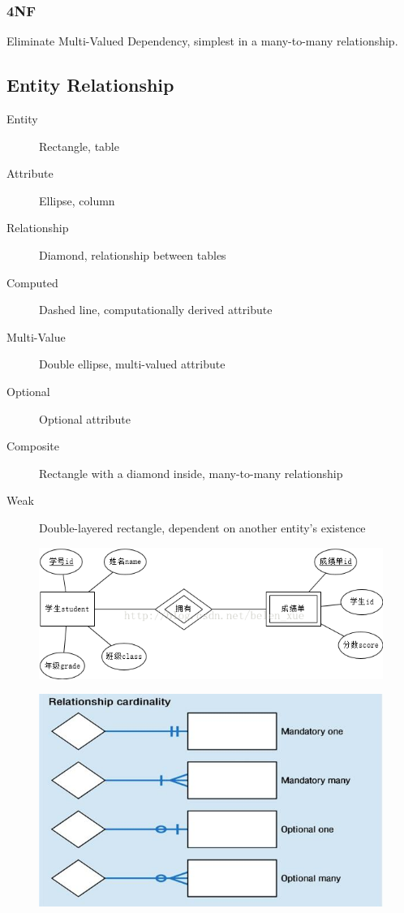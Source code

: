 \documentclass[11pt,journal,compsoc]{IEEEtran}
\begin{document}
\subsubsection{4NF}

Eliminate Multi-Valued Dependency, simplest in a many-to-many relationship.


\subsection{Entity Relationship}

\begin{description}
    \item[Entity] Rectangle, table
    \item[Attribute] Ellipse, column
    \item[Relationship] Diamond, relationship between tables
    \item[Computed] Dashed line, computationally derived attribute
    \item[Multi-Value] Double ellipse, multi-valued attribute
    \item[Optional] Optional attribute
    \item[Composite] Rectangle with a diamond inside, many-to-many relationship
    \item[Weak] Double-layered rectangle, dependent on another entity's existence
\end{description}

\begin{figure}[H]
    \centering
    \includegraphics[width=\linewidth]{ER2.png}
\end{figure}

\begin{figure}[H]
    \centering
    \includegraphics[width=\linewidth]{ER.jpg}
\end{figure}
\end{document}
